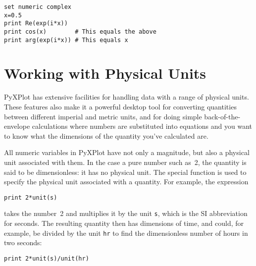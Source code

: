 \begin{verbatim}
set numeric complex
x=0.5
print Re(exp(i*x))
print cos(x)        # This equals the above
print arg(exp(i*x)) # This equals x
\end{verbatim}

\section{Working with Physical Units}
\label{sec:units}

PyXPlot has extensive facilities for handling data with a range of physical
units.  These features also make it a powerful desktop tool for converting
quantities between different imperial and metric units, and for doing simple
back-of-the-envelope calculations where numbers are substituted into equations
and you want to know what the dimensions of the quantity you've calculated are.

All numeric variables in PyXPlot have not only a magnitude, but also a
physical unit associated with them. In the case a pure number such as~2, the
quantity is said to be dimensionless: it has no physical unit. The special
function  is used to specify the physical unit associated with a
quantity. For example, the expression

\begin{verbatim}
print 2*unit(s)
\end{verbatim}

\noindent takes the number~2 and multiplies it by the unit {\tt s}, which is
the SI abbreviation for seconds.  The resulting quantity then has dimensions of
time, and could, for example, be divided by the unit {\tt hr} to find the
dimensionless number of hours in two seconds:

\begin{verbatim}
print 2*unit(s)/unit(hr)
\end{verbatim}

